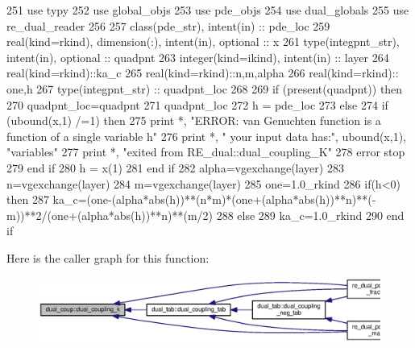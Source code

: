 \begin{DoxyCode}
251     \textcolor{keywordtype}{use }typy
252     \textcolor{keywordtype}{use }global_objs
253     \textcolor{keywordtype}{use }pde_objs
254     \textcolor{keywordtype}{use }dual_globals
255     \textcolor{keywordtype}{use }re_dual_reader
256     
257     \textcolor{keywordtype}{class}(pde_str), \textcolor{keywordtype}{intent(in)} :: pde\_loc
259     \textcolor{keywordtype}{real(kind=rkind)}, \textcolor{keywordtype}{dimension(:)}, \textcolor{keywordtype}{intent(in)}, \textcolor{keywordtype}{optional}    :: x
261     \textcolor{keywordtype}{type}(integpnt_str), \textcolor{keywordtype}{intent(in)}, \textcolor{keywordtype}{optional} :: quadpnt
263     \textcolor{keywordtype}{integer(kind=ikind)}, \textcolor{keywordtype}{intent(in)} :: layer
264     \textcolor{keywordtype}{real(kind=rkind)}::ka\_c
265     \textcolor{keywordtype}{real(kind=rkind)}::n,m,alpha
266     \textcolor{keywordtype}{real(kind=rkind)}:: one,h
267     \textcolor{keywordtype}{type}(integpnt_str) :: quadpnt\_loc
268           
269      \textcolor{keywordflow}{if} (\textcolor{keyword}{present}(quadpnt)) \textcolor{keywordflow}{then}
270         quadpnt\_loc=quadpnt
271         quadpnt\_loc%
272         h = pde\_loc%
273      \textcolor{keywordflow}{else}
274          \textcolor{keywordflow}{if} (ubound(x,1) /=1) \textcolor{keywordflow}{then}
275            print *, \textcolor{stringliteral}{"ERROR: van Genuchten function is a function of a single variable h"}
276            print *, \textcolor{stringliteral}{"       your input data has:"}, ubound(x,1), \textcolor{stringliteral}{"variables"}
277            print *, \textcolor{stringliteral}{"exited from RE\_dual::dual\_coupling\_K"}
278            error stop
279 \textcolor{keywordflow}{         end if}
280            h = x(1)
281 \textcolor{keywordflow}{     end if}  
282     alpha=vgexchange(layer)%
283     n=vgexchange(layer)%
284     m=vgexchange(layer)%
285     one=1.0\_rkind 
286     \textcolor{keywordflow}{if}(h<0) \textcolor{keywordflow}{then}
287       ka\_c=(one-(alpha*abs(h))**(n*m)*(one+(alpha*abs(h))**n)**(-m))**2/(one+(alpha*abs(h))**n)**(m/2)
288     \textcolor{keywordflow}{else}
289       ka\_c=1.0\_rkind
290 \textcolor{keywordflow}{    end if}
\end{DoxyCode}


Here is the caller graph for this function\+:
\nopagebreak
\begin{figure}[H]
\begin{center}
\leavevmode
\includegraphics[width=350pt]{namespacedual__coup_a77fbe6b94667bab7c4a93936da557f24_icgraph}
\end{center}
\end{figure}


